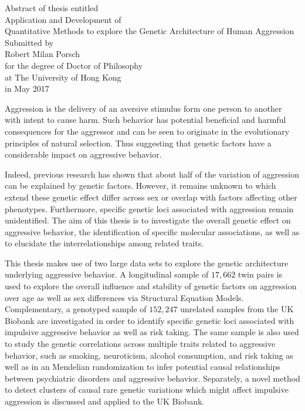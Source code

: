 \documentclass[header.tex]{subfiles}
\begin{document}
\begin{center}
  Abstract of thesis entitled \\
  \vspace*{\baselineskip}
  {\LARGE Application and Development of \\ Quantitative Methods to explore the Genetic Architecture of Human Aggression}\\[0.2\baselineskip]
  \vspace*{\baselineskip}
  Submitted by\\
  \vspace*{\baselineskip}
  {\LARGE Robert Milan Porsch}\\
  \vspace*{\baselineskip}
  for the degree of Doctor of Philosophy \\ at The University of Hong Kong \\ in May 2017
\end{center}


Aggression is the delivery of an aversive stimulus form one person to another with intent to cause harm.
Such behavior has potential beneficial and harmful consequences for the aggressor and can be seen to originate in the evolutionary principles of natural selection.
Thus suggesting that genetic factors have a considerable impact on aggressive behavior.

Indeed, previous research has shown that about half of the variation of aggression can be explained by genetic factors.
However, it remains unknown to which extend these genetic effect differ across sex or overlap with factors affecting other phenotypes.
Furthermore, specific genetic loci associated with aggression remain unidentified.
The aim of this thesis is to investigate the overall genetic effect on aggressive behavior, the identification of specific molecular associations, as well as to elucidate the interrelationships among related traits. 

This thesis makes use of two large data sets to explore the genetic architecture underlying aggressive behavior.
A longitudinal sample of $17,662$ twin pairs is used to explore the overall influence and stability of genetic factors on aggression over age as well as sex differences via Structural Equation Models.
Complementary, a genotyped sample of $152,247$ unrelated samples from the UK Biobank are investigated in order to identify specific genetic loci associated with impulsive aggressive behavior as well as risk taking.
The same sample is also used to study the genetic correlations across multiple traits related to aggressive behavior, such as smoking, neuroticism, alcohol consumption, and risk taking as well as in an Mendelian randomization to infer potential causal relationships between psychiatric disorders and aggressive behavior.
Separately, a novel method to detect clusters of causal rare genetic variations which might affect impulsive aggression is discussed and applied to the UK Biobank. 
\end{document}
